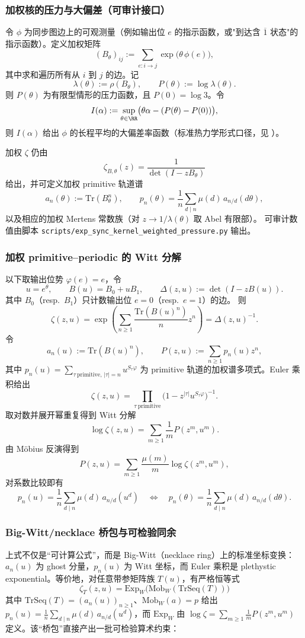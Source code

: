 \subsubsection{加权核的压力与大偏差（可审计接口）}
令 $\phi$ 为同步图边上的可观测量（例如输出位 $e$ 的指示函数，或"到达含 $\overline{1}$ 状态"的指示函数）。定义加权矩阵
\[
(B_\theta)_{ij}:=\sum_{e:i\to j}\exp\bigl(\theta\,\phi(e)\bigr),
\]
其中求和遍历所有从 $i$ 到 $j$ 的边。记
\[
\lambda(\theta):=\rho(B_\theta),\qquad P(\theta):=\log\lambda(\theta).
\]
则 $P(\theta)$ 为有限型情形的压力函数，且 $P(0)=\log 3$。令
\[
I(\alpha):=\sup_{\theta\in\RR}\bigl(\theta\alpha-(P(\theta)-P(0))\bigr),
\]
则 $I(\alpha)$ 给出 $\phi$ 的长程平均的大偏差率函数（标准热力学形式口径，见 \cite{Ruelle1978Thermodynamic,ParryPollicott1990Zeta}）。

加权 $\zeta$ 仍由
\[
\zeta_{B,\theta}(z)=\frac{1}{\det(I-zB_\theta)}
\]
给出，并可定义加权 primitive 轨道谱
\[
a_n(\theta):=\mathrm{Tr}(B_\theta^n),\qquad
p_n(\theta)=\frac{1}{n}\sum_{d\mid n}\mu(d)\,a_{n/d}(d\theta),
\]
以及相应的加权 Mertens 常数族（对 $z\to 1/\lambda(\theta)$ 取 Abel 有限部）。
可审计数值由脚本 \texttt{scripts/exp\_sync\_kernel\_weighted\_pressure.py} 输出。

\subsubsection{加权 primitive--periodic 的 Witt 分解}\label{app:witt-weighted}
以下取输出位势 $\varphi(e)=e$，令
\[
u=e^\theta,\qquad B(u)=B_0+uB_1,\qquad \Delta(z,u):=\det(I-zB(u)).
\]
其中 $B_0$（resp.\ $B_1$）只计数输出位 $e=0$（resp.\ $e=1$）的边。
则
\[
\zeta(z,u)=\exp\!\left(\sum_{n\ge 1}\frac{\mathrm{Tr}(B(u)^n)}{n}z^n\right)=\Delta(z,u)^{-1}.
\]
令
\[
a_n(u):=\mathrm{Tr}(B(u)^n),\qquad
P(z,u):=\sum_{n\ge 1}p_n(u)z^n,
\]
其中
\(
p_n(u)=\sum_{\tau\ \mathrm{primitive},\,|\tau|=n}u^{S_\tau\varphi}
\)
为 primitive 轨道的加权谱多项式。Euler 乘积给出
\[
\zeta(z,u)=\prod_{\tau\ \mathrm{primitive}}\bigl(1-z^{|\tau|}u^{S_\tau\varphi}\bigr)^{-1}.
\]
取对数并展开幂重复得到 Witt 分解
\[
\log\zeta(z,u)=\sum_{m\ge 1}\frac{1}{m}P(z^m,u^m).
\]
由 Möbius 反演得到
\[
P(z,u)=\sum_{m\ge 1}\frac{\mu(m)}{m}\log\zeta(z^m,u^m),
\]
对系数比较即有
\[
p_n(u)=\frac{1}{n}\sum_{d\mid n}\mu(d)\,a_{n/d}(u^d)
\quad\Longleftrightarrow\quad
p_n(\theta)=\frac{1}{n}\sum_{d\mid n}\mu(d)\,a_{n/d}(d\theta).
\]

\subsubsection{Big-Witt/necklace 桥包与可检验同余}\label{app:witt-bridge-package}
上式不仅是“可计算公式”，而是 Big-Witt（necklace ring）上的标准坐标变换：$a_n(u)$ 为 ghost 分量，$p_n(u)$ 为 Witt 坐标，而 Euler 乘积是 plethystic exponential。等价地，对任意带参矩阵族 $T(u)$，有严格恒等式
\[
\boxed{\ \zeta_T(z,u)=\mathrm{Exp}_W\bigl(\mathrm{Mob}_W(\mathrm{TrSeq}(T))\bigr)\ }
\]
其中 $\mathrm{TrSeq}(T)=(a_n(u))_{n\ge 1}$、$\mathrm{Mob}_W(a)=p$ 给出 $p_n(u)=\frac1n\sum_{d\mid n}\mu(d)\,a_{n/d}(u^d)$，而 $\mathrm{Exp}_W$ 由
\(
\log\zeta=\sum_{m\ge 1}\frac{1}{m}P(z^m,u^m)
\)
定义。该“桥包”直接产出一批可检验算术约束：

